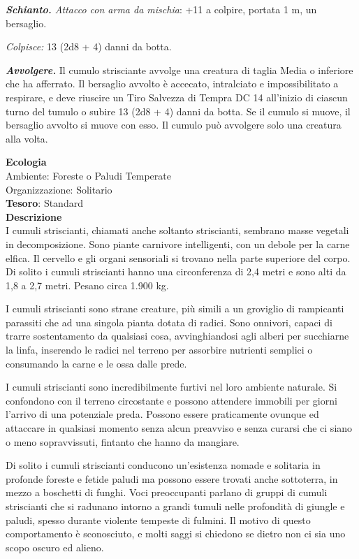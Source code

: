 \begin{multicols}{2}
	\textit{\textbf{Schianto.} Attacco con arma da mischia}: +11 a colpire, portata 1 m, un bersaglio.

	\textit{Colpisce:} 13 (2d8 + 4) danni da botta.

	\textit{\textbf{Avvolgere.}} Il cumulo strisciante avvolge una creatura di taglia Media o inferiore che ha afferrato. Il bersaglio avvolto è accecato, intralciato e impossibilitato a respirare, e deve riuscire un Tiro Salvezza di Tempra DC 14 all'inizio di ciascun turno del tumulo o subire 13 (2d8 + 4) danni da botta. Se il cumulo si muove, il bersaglio avvolto si muove con esso. Il cumulo può avvolgere solo una creatura alla volta.

	\textbf{Ecologia}\\
	Ambiente: Foreste o Paludi Temperate\\
	Organizzazione: Solitario\\
	\textbf{Tesoro}: Standard\\
	\textbf{Descrizione}\\
	I cumuli striscianti, chiamati anche soltanto striscianti, sembrano masse vegetali in decomposizione. Sono piante carnivore intelligenti, con un debole per la carne elfica. Il cervello e gli organi sensoriali si trovano nella parte superiore del corpo. Di solito i cumuli striscianti hanno una circonferenza di 2,4 metri e sono alti da 1,8 a 2,7 metri. Pesano circa 1.900 kg.

	I cumuli striscianti sono strane creature, più simili a un groviglio di rampicanti parassiti che ad una singola pianta dotata di radici. Sono onnivori, capaci di trarre sostentamento da qualsiasi cosa, avvinghiandosi agli alberi per succhiarne la linfa, inserendo le radici nel terreno per assorbire nutrienti semplici o consumando la carne e le ossa dalle prede.

	I cumuli striscianti sono incredibilmente furtivi nel loro ambiente naturale. Si confondono con il terreno circostante e possono attendere immobili per giorni l'arrivo di una potenziale preda. Possono essere praticamente ovunque ed attaccare in qualsiasi momento senza alcun preavviso e senza curarsi che ci siano o meno sopravvissuti, fintanto che hanno da mangiare.

	Di solito i cumuli striscianti conducono un'esistenza nomade e solitaria in profonde foreste e fetide paludi ma possono essere trovati anche sottoterra, in mezzo a boschetti di funghi. Voci preoccupanti parlano di gruppi di cumuli striscianti che si radunano intorno a grandi tumuli nelle profondità di giungle e paludi, spesso durante violente tempeste di fulmini. Il motivo di questo comportamento è sconosciuto, e molti saggi si chiedono se dietro non ci sia uno scopo oscuro ed alieno.


\end{multicols}
